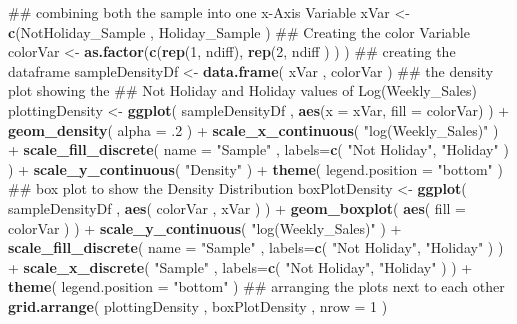 \documentclass[]{article}
\newenvironment{Shaded}{\begin{snugshade}}{\end{snugshade}}
\newcommand{\KeywordTok}[1]{\textcolor[rgb]{0.13,0.29,0.53}{\textbf{{#1}}}}
\newcommand{\DataTypeTok}[1]{\textcolor[rgb]{0.13,0.29,0.53}{{#1}}}
\newcommand{\DecValTok}[1]{\textcolor[rgb]{0.00,0.00,0.81}{{#1}}}
\newcommand{\StringTok}[1]{\textcolor[rgb]{0.31,0.60,0.02}{{#1}}}
\newcommand{\NormalTok}[1]{{#1}}
\begin{document}
\begin{Shaded}
\begin{Highlighting}[]
\NormalTok{## combining both the sample into one x-Axis Variable}
\NormalTok{xVar <-}\StringTok{ }\KeywordTok{c}\NormalTok{(NotHoliday_Sample , Holiday_Sample )}
\NormalTok{## Creating the color Variable}
\NormalTok{colorVar <-}\StringTok{ }\KeywordTok{as.factor}\NormalTok{(}\KeywordTok{c}\NormalTok{(}\KeywordTok{rep}\NormalTok{(}\DecValTok{1}\NormalTok{, ndiff), }\KeywordTok{rep}\NormalTok{(}\DecValTok{2}\NormalTok{, ndiff ) ) )}
\NormalTok{## creating the dataframe}
\NormalTok{sampleDensityDf <-}\StringTok{ }\KeywordTok{data.frame}\NormalTok{( xVar ,  colorVar )}
\NormalTok{## the density plot showing the }
\NormalTok{## Not Holiday and Holiday values of Log(Weekly_Sales)}
\NormalTok{plottingDensity <-}\StringTok{ }\KeywordTok{ggplot}\NormalTok{( sampleDensityDf , }\KeywordTok{aes}\NormalTok{(}\DataTypeTok{x =} \NormalTok{xVar, }\DataTypeTok{fill =} \NormalTok{colorVar) ) +}\StringTok{ }
\StringTok{  }\KeywordTok{geom_density}\NormalTok{( }\DataTypeTok{alpha =} \NormalTok{.}\DecValTok{2} \NormalTok{) +}
\StringTok{  }\KeywordTok{scale_x_continuous}\NormalTok{( }\StringTok{"log(Weekly_Sales)"} \NormalTok{) +}
\StringTok{  }\KeywordTok{scale_fill_discrete}\NormalTok{( }
    \DataTypeTok{name =} \StringTok{"Sample"} \NormalTok{, }\DataTypeTok{labels=}\KeywordTok{c}\NormalTok{( }\StringTok{"Not Holiday"}\NormalTok{, }\StringTok{"Holiday"} \NormalTok{) ) +}
\StringTok{  }\KeywordTok{scale_y_continuous}\NormalTok{( }\StringTok{"Density"} \NormalTok{) +}
\StringTok{  }\KeywordTok{theme}\NormalTok{( }\DataTypeTok{legend.position =} \StringTok{"bottom"} \NormalTok{)}
\NormalTok{## box plot to show the Density Distribution}
\NormalTok{boxPlotDensity <-}\StringTok{ }\KeywordTok{ggplot}\NormalTok{( sampleDensityDf , }\KeywordTok{aes}\NormalTok{( colorVar , xVar ) ) +}\StringTok{ }
\StringTok{  }\KeywordTok{geom_boxplot}\NormalTok{( }\KeywordTok{aes}\NormalTok{( }\DataTypeTok{fill =} \NormalTok{colorVar ) ) +}\StringTok{ }
\StringTok{  }\KeywordTok{scale_y_continuous}\NormalTok{( }\StringTok{"log(Weekly_Sales)"} \NormalTok{) +}
\StringTok{  }\KeywordTok{scale_fill_discrete}\NormalTok{( }
    \DataTypeTok{name =} \StringTok{"Sample"} \NormalTok{, }\DataTypeTok{labels=}\KeywordTok{c}\NormalTok{( }\StringTok{"Not Holiday"}\NormalTok{, }\StringTok{"Holiday"} \NormalTok{) ) +}
\StringTok{  }\KeywordTok{scale_x_discrete}\NormalTok{( }\StringTok{"Sample"} \NormalTok{, }\DataTypeTok{labels=}\KeywordTok{c}\NormalTok{( }\StringTok{"Not Holiday"}\NormalTok{, }\StringTok{"Holiday"} \NormalTok{)  ) +}
\StringTok{  }\KeywordTok{theme}\NormalTok{( }\DataTypeTok{legend.position =} \StringTok{"bottom"} \NormalTok{)}
\NormalTok{## arranging the plots next to each other}
\KeywordTok{grid.arrange}\NormalTok{( plottingDensity , boxPlotDensity , }\DataTypeTok{nrow =} \DecValTok{1} \NormalTok{)}
\end{Highlighting}
\end{Shaded}
\end{document}
